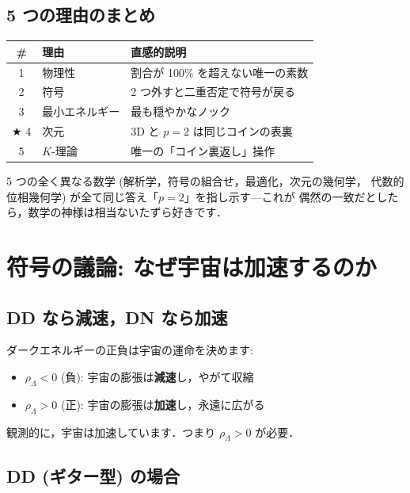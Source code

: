 \documentclass[11pt,a4paper]{article}
\begin{document}
\subsection{5 つの理由のまとめ}

\begin{center}
\begin{tabular}{clp{18em}}
\toprule
\# & 理由 & 直感的説明 \\
\midrule
1 & 物理性 & 割合が 100\% を超えない唯一の素数 \\
2 & 符号 & 2 つ外すと二重否定で符号が戻る \\
3 & 最小エネルギー & 最も穏やかなノック \\
$\bigstar$ 4 & 次元 & 3D と $p{=}2$ は同じコインの表裏 \\
5 & $K$-理論 & 唯一の「コイン裏返し」操作 \\
\bottomrule
\end{tabular}
\end{center}

5 つの全く異なる数学 (解析学，符号の組合せ，最適化，次元の幾何学，
代数的位相幾何学) が全て同じ答え「$p = 2$」を指し示す---これが
偶然の一致だとしたら，数学の神様は相当ないたずら好きです．

\section{符号の議論: なぜ宇宙は加速するのか}

\subsection{DD なら減速，DN なら加速}

ダークエネルギーの正負は宇宙の運命を決めます:
\begin{itemize}
\item $\rho_\Lambda < 0$ (負): 宇宙の膨張は\textbf{減速}し，やがて収縮
\item $\rho_\Lambda > 0$ (正): 宇宙の膨張は\textbf{加速}し，永遠に広がる
\end{itemize}

観測的に，宇宙は加速しています．つまり $\rho_\Lambda > 0$ が必要．

\subsection{DD (ギター型) の場合}
\end{document}

